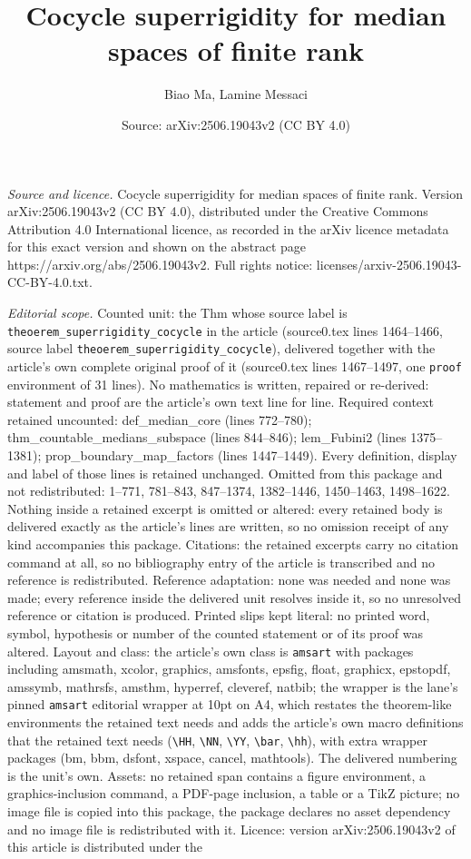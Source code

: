 \documentclass[10pt,a4paper]{amsart}
\title[Cocycle superrigidity for median spaces of finite rank]{Cocycle superrigidity for median spaces of finite rank}
\author{Biao Ma, Lamine Messaci}
\date{Source: arXiv:2506.19043v2 (CC BY 4.0)}
\begin{document}
\maketitle

\noindent\emph{Source and licence.} Cocycle superrigidity for median spaces of finite rank. Version arXiv:2506.19043v2 (CC BY 4.0), distributed under the Creative Commons Attribution 4.0 International licence, as recorded in the arXiv licence metadata for this exact version and shown on the abstract page https://arxiv.org/abs/2506.19043v2. Full rights notice: licenses/arxiv-2506.19043-CC-BY-4.0.txt.\par\smallskip

\noindent\textit{Editorial scope.} Counted unit: the Thm whose source label is \texttt{theoerem\_superrigidity\_cocycle} in the article (source0.tex lines 1464--1466, source label \texttt{theoerem\_superrigidity\_cocycle}), delivered together with the article's own complete original proof of it (source0.tex lines 1467--1497, one \texttt{proof} environment of 31 lines). No mathematics is written, repaired or re-derived: statement and proof are the article's own text line for line. Required context retained uncounted: def\_median\_core (lines 772--780); thm\_countable\_medians\_subspace (lines 844--846); lem\_Fubini2 (lines 1375--1381); prop\_boundary\_map\_factors (lines 1447--1449). Every definition, display and label of those lines is retained unchanged. Omitted from this package and not redistributed: 1--771, 781--843, 847--1374, 1382--1446, 1450--1463, 1498--1622. Nothing inside a retained excerpt is omitted or altered: every retained body is delivered exactly as the article's lines are written, so no omission receipt of any kind accompanies this package. Citations: the retained excerpts carry no citation command at all, so no bibliography entry of the article is transcribed and no reference is redistributed. Reference adaptation: none was needed and none was made; every reference inside the delivered unit resolves inside it, so no unresolved reference or citation is produced. Printed slips kept literal: no printed word, symbol, hypothesis or number of the counted statement or of its proof was altered. Layout and class: the article's own class is \texttt{amsart} with packages including amsmath, xcolor, graphics, amsfonts, epsfig, float, graphicx, epstopdf, amssymb, mathrsfs, amsthm, hyperref, cleveref, natbib; the wrapper is the lane's pinned \texttt{amsart} editorial wrapper at 10pt on A4, which restates the theorem-like environments the retained text needs and adds the article's own macro definitions that the retained text needs (\texttt{\textbackslash HH}, \texttt{\textbackslash NN}, \texttt{\textbackslash YY}, \texttt{\textbackslash bar}, \texttt{\textbackslash hh}), with extra wrapper packages (bm, bbm, dsfont, xspace, cancel, mathtools). The delivered numbering is the unit's own. Assets: no retained span contains a figure environment, a graphics-inclusion command, a PDF-page inclusion, a table or a TikZ picture; no image file is copied into this package, the package declares no asset dependency and no image file is redistributed with it. Licence: version arXiv:2506.19043v2 of this article is distributed under the 
\end{document}
